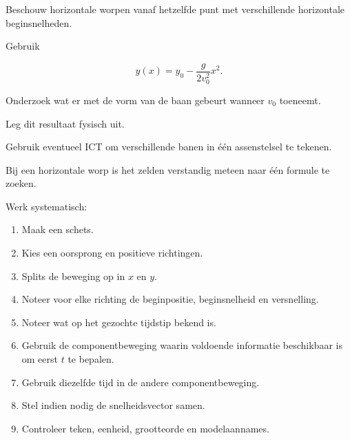 \documentclass{ximera}
\begin{document}
\begin{oefening}{\oefG}

Beschouw horizontale worpen vanaf hetzelfde punt met verschillende
horizontale beginsnelheden.

Gebruik

\[
y(x)
=
y_0-\frac{g}{2v_0^2}x^2.
\]

\begin{question}
Onderzoek wat er met de vorm van de baan gebeurt wanneer $v_0$
toeneemt.
\end{question}

\begin{question}
Leg dit resultaat fysisch uit.
\end{question}

\begin{question}
Gebruik eventueel ICT om verschillende banen in één assenstelsel te
tekenen.
\end{question}

\end{oefening}




Bij een horizontale worp is het zelden verstandig meteen naar één
formule te zoeken.

Werk systematisch:

\begin{enumerate}
  \item Maak een schets.
  \item Kies een oorsprong en positieve richtingen.
  \item Splits de beweging op in $x$ en $y$.
  \item Noteer voor elke richting de beginpositie, beginsnelheid en
        versnelling.
  \item Noteer wat op het gezochte tijdstip bekend is.
  \item Gebruik de componentbeweging waarin voldoende informatie
        beschikbaar is om eerst $t$ te bepalen.
  \item Gebruik diezelfde tijd in de andere componentbeweging.
  \item Stel indien nodig de snelheidsvector samen.
  \item Controleer teken, eenheid, grootteorde en modelaannames.
\end{enumerate}
\end{document}
